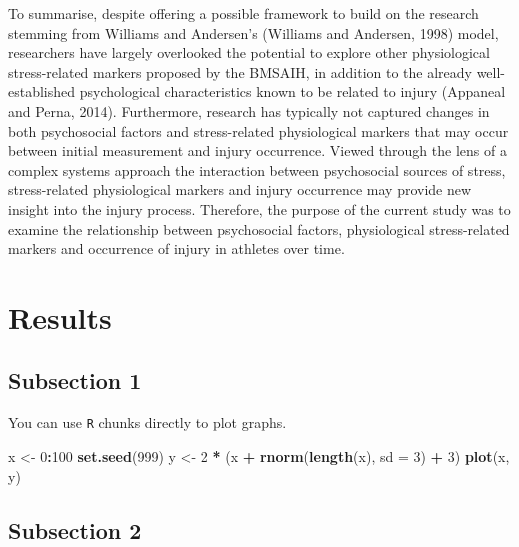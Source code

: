 \documentclass[utf8]{frontiersHLTH}
\newenvironment{Shaded}{\begin{snugshade}}{\end{snugshade}}
\newcommand{\DataTypeTok}[1]{\textcolor[rgb]{0.13,0.29,0.53}{#1}}
\newcommand{\DecValTok}[1]{\textcolor[rgb]{0.00,0.00,0.81}{#1}}
\newcommand{\KeywordTok}[1]{\textcolor[rgb]{0.13,0.29,0.53}{\textbf{#1}}}
\newcommand{\NormalTok}[1]{#1}
\newcommand{\OperatorTok}[1]{\textcolor[rgb]{0.81,0.36,0.00}{\textbf{#1}}}
\newcommand{\StringTok}[1]{\textcolor[rgb]{0.31,0.60,0.02}{#1}}
\begin{document}
To summarise, despite offering a possible framework to build on the
research stemming from Williams and Andersen's (Williams and Andersen,
1998) model, researchers have largely overlooked the potential to
explore other physiological stress-related markers proposed by the
BMSAIH, in addition to the already well-established psychological
characteristics known to be related to injury (Appaneal and Perna,
2014). Furthermore, research has typically not captured changes in both
psychosocial factors and stress-related physiological markers that may
occur between initial measurement and injury occurrence. Viewed through
the lens of a complex systems approach the interaction between
psychosocial sources of stress, stress-related physiological markers and
injury occurrence may provide new insight into the injury process.
Therefore, the purpose of the current study was to examine the
relationship between psychosocial factors, physiological stress-related
markers and occurrence of injury in athletes over time.

\hypertarget{results}{%
\section*{Results}\label{results}}

\hypertarget{subsection-1}{%
\subsection*{Subsection 1}\label{subsection-1}}

You can use \texttt{R} chunks directly to plot graphs.

\begin{Shaded}
\begin{Highlighting}[]
\NormalTok{x <-}\StringTok{ }\DecValTok{0}\OperatorTok{:}\DecValTok{100}
\KeywordTok{set.seed}\NormalTok{(}\DecValTok{999}\NormalTok{)}
\NormalTok{y <-}\StringTok{ }\DecValTok{2} \OperatorTok{*}\StringTok{ }\NormalTok{(x }\OperatorTok{+}\StringTok{ }\KeywordTok{rnorm}\NormalTok{(}\KeywordTok{length}\NormalTok{(x), }\DataTypeTok{sd =} \DecValTok{3}\NormalTok{) }\OperatorTok{+}\StringTok{ }\DecValTok{3}\NormalTok{)}
\KeywordTok{plot}\NormalTok{(x, y)}
\end{Highlighting}
\end{Shaded}

\hypertarget{subsection-2}{%
\subsection*{Subsection 2}\label{subsection-2}}
\end{document}
